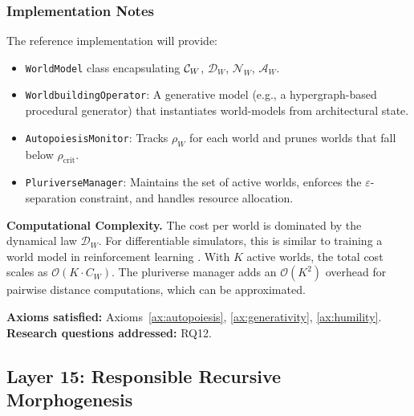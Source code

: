 \subsubsection{Implementation Notes}
The reference implementation will provide:
\begin{itemize}
    \item \texttt{WorldModel} class encapsulating $\mathcal{C}_W$, $\mathcal{D}_W$, $\mathcal{N}_W$, $\mathcal{A}_W$.
    \item \texttt{WorldbuildingOperator}: A generative model (e.g., a hypergraph-based procedural generator) that instantiates world-models from architectural state.
    \item \texttt{AutopoiesisMonitor}: Tracks $\rho_W$ for each world and prunes worlds that fall below $\rho_{\text{crit}}$.
    \item \texttt{PluriverseManager}: Maintains the set of active worlds, enforces the $\varepsilon$-separation constraint, and handles resource allocation.
\end{itemize}

\textbf{Computational Complexity.} The cost per world is dominated by the dynamical law $\mathcal{D}_W$. For differentiable simulators, this is similar to training a world model in reinforcement learning \cite{ha2018}. With $K$ active worlds, the total cost scales as $\mathcal{O}(K \cdot C_W)$. The pluriverse manager adds an $\mathcal{O}(K^2)$ overhead for pairwise distance computations, which can be approximated.

\textbf{Axioms satisfied:} Axioms~\ref{ax:autopoiesis}, \ref{ax:generativity}, \ref{ax:humility}. \\
\textbf{Research questions addressed:} RQ12.

\subsection{Layer 15: Responsible Recursive Morphogenesis}
\label{subsec:layer15}

